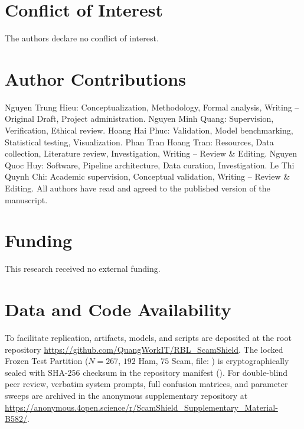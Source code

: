 \documentclass[journal]{IEEEtran}
\begin{document}
\section*{Conflict of Interest}
The authors declare no conflict of interest.

\section*{Author Contributions}
Nguyen Trung Hieu: Conceptualization, Methodology, Formal analysis, Writing -- Original Draft, Project administration.
Nguyen Minh Quang: Supervision, Verification, Ethical review.
Hoang Hai Phuc: Validation, Model benchmarking, Statistical testing, Visualization.
Phan Tran Hoang Tran: Resources, Data collection, Literature review, Investigation, Writing -- Review \& Editing.
Nguyen Quoc Huy: Software, Pipeline architecture, Data curation, Investigation.
Le Thi Quynh Chi: Academic supervision, Conceptual validation, Writing -- Review \& Editing.
All authors have read and agreed to the published version of the manuscript.

\section*{Funding}
This research received no external funding.

\section*{Data and Code Availability}
To facilitate replication, artifacts, models, and scripts are deposited at the root repository \url{https://github.com/QuangWorkIT/RBL_ScamShield}. The locked Frozen Test Partition ($N=267$, $192$ Ham, $75$ Scam, file: ) is cryptographically sealed with SHA-256 checksum  in the repository manifest (). For double-blind peer review, verbatim system prompts, full confusion matrices, and parameter sweeps are archived in the anonymous supplementary repository at \url{https://anonymous.4open.science/r/ScamShield_Supplementary_Material-B582/}.


\end{document}
